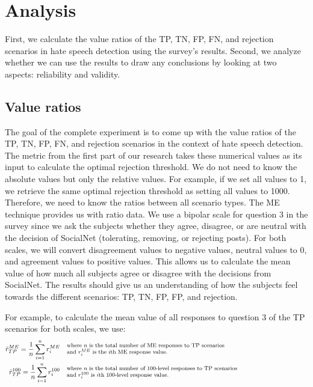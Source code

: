 \documentclass[a4paper]{article}
\begin{document}
\section{Analysis}
First, we calculate the value ratios of the TP, TN, FP, FN, and rejection scenarios in hate speech detection using the survey's results. Second, we analyze whether we can use the results to draw any conclusions by looking at two aspects: reliability and validity.

\subsection{Value ratios}
\label{sec:analysis-values}
The goal of the complete experiment is to come up with the value ratios of the TP, TN, FP, FN, and rejection scenarios in the context of hate speech detection. The metric from the first part of our research takes these numerical values as its input to calculate the optimal rejection threshold. We do not need to know the absolute values but only the relative values. For example, if we set all values to 1, we retrieve the same optimal rejection threshold as setting all values to 1000. Therefore, we need to know the ratios between all scenario types. The ME technique provides us with ratio data. We use a bipolar scale for question 3 in the survey since we ask the subjects whether they agree, disagree, or are neutral with the decision of SocialNet (tolerating, removing, or rejecting posts). For both scales, we will convert disagreement values to negative values, neutral values to 0, and agreement values to positive values. This allows us to calculate the mean value of how much all subjects agree or disagree with the decisions from SocialNet. The results should give us an understanding of how the subjects feel towards the different scenarios: TP, TN, FP, FP, and rejection.

For example, to calculate the mean value of all responses to question 3 of the TP scenarios for both scales, we use:
\begin{align*}
    \bar{r}_{TP}^{ME} = \frac{1}{n} \sum_{i=1}^{n} r_i^{ME}   & \quad  \parbox{35em}{\footnotesize where $n$ is the total number of ME responses to TP scenarios       \\and $r_i^{ME}$ is the $i$th ME response value.}\\
    \bar{r}_{TP}^{100} = \frac{1}{n} \sum_{i=1}^{n} r_i^{100} & \quad \parbox{35em}{\footnotesize where $n$ is the total number of 100-level responses to TP scenarios \\and $r_i^{100}$ is $i$th 100-level response value.}
\end{align*}
\end{document}
